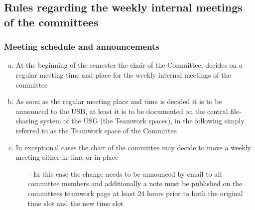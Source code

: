 \subsection[Meeting]{Rules regarding the weekly internal meetings of the committees}\label{provision:internal meetings}
\subsubsection{Meeting schedule and announcements}
\begin{enumerate}[a)]
	\item At the beginning of the semester the chair of the Committee, decides on a regular meeting time and place for the weekly internal meetings of the committee\\
	\item As soon as the regular meeting place and time is decided it is to be announced to the USB, at least it is to be documented on the central file-sharing system of the USG (the Teamwork spaces), in the following simply referred to as the Teamwork space of the Committee
	\item In exceptional cases the chair of the committee may decide to move a weekly meeting either in time or in place \begin{itemize}
		\item[--] In this case the change needs to be announced by email to all committee members and additionally a note must be published on the committees teamwork page at least 24 hours prior to both the original time slot and the new time slot
	\end{itemize}
\end{enumerate}
